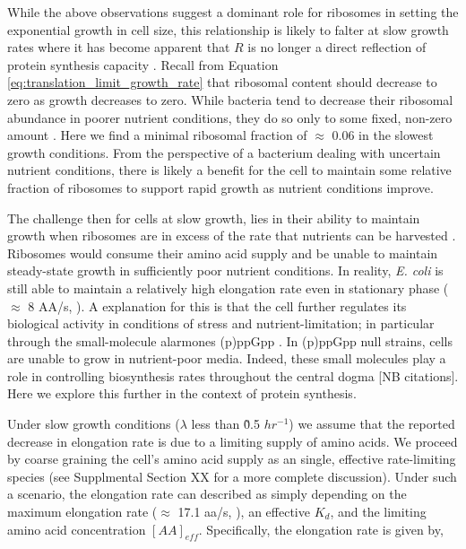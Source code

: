 While the above observations suggest a dominant role for ribosomes in
setting the exponential growth in cell size, this relationship is
likely to falter at slow growth rates where it has become apparent that $R$ is
no longer a direct reflection of protein synthesis capacity \citep{dai2016}.
Recall from Equation \ref{eq:translation_limit_growth_rate} that ribosomal
content should decrease to zero as growth decreases to zero. While bacteria tend
to decrease their ribosomal abundance in poorer nutrient conditions, they do so
only to some fixed, non-zero amount \citep{scott2010, liebermeister2014}. Here
we find a minimal ribosomal fraction of $\approx$ 0.06 in the slowest growth
conditions. From the perspective of a bacterium dealing with uncertain nutrient
conditions, there is likely a benefit for the cell to maintain some relative
fraction of ribosomes to support rapid growth as nutrient conditions improve.

The challenge then for cells at slow growth, lies in their ability to maintain
growth when ribosomes are in excess of the rate that nutrients can be harvested
. Ribosomes would consume their amino acid
supply and be unable to maintain steady-state growth in sufficiently poor
nutrient conditions. In reality, \textit{E. coli} is still able to maintain a
relatively high elongation rate even in stationary phase ($\approx$ 8 AA/s,
\citep{dai2016, dai2018}). A explanation for this is that the cell further
regulates its biological activity in conditions of stress and
nutrient-limitation; in particular through the small-molecule alarmones (p)ppGpp
\citep{harris2018}. In (p)ppGpp null strains, cells are unable to grow in
nutrient-poor media. Indeed, these small molecules play a role in controlling
biosynthesis rates throughout the central dogma [NB citations]. Here we explore
this further in the context of protein synthesis.

Under slow growth conditions ($\lambda$ less than \~ 0.5 $hr^{-1}$) we assume
that the reported decrease in elongation rate is due to a limiting supply of
amino acids. We proceed by coarse graining the cell's amino acid supply as an
single, effective rate-limiting species (see Supplmental Section XX for a more
complete discussion). Under such a scenario, the elongation rate can described
as simply depending on the maximum elongation rate ($\approx$ 17.1 aa/s,
\citep{dai2016, dai2018}), an effective $K_d$, and the limiting amino acid
concentration $[AA]_{eff}$. Specifically, the elongation rate is given by,


